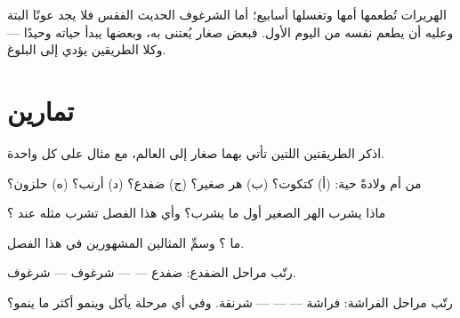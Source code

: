 \begin{remark}\label{rem:g2:animals-grow-up:care}
الهريرات تُطعمها أمها وتغسلها أسابيع؛ أما الشرغوف الحديث الفقس فلا
يجد عونًا البتة وعليه أن يطعم نفسه من اليوم الأول. فبعض صغار
 يُعتنى به، وبعضها يبدأ حياته وحيدًا --- وكلا الطريقين
يؤدي إلى البلوغ.
\end{remark}

\section{تمارين}

\begin{exercise}[$\star$]\label{exo:g2:animals-grow-up:1}
اذكر الطريقتين اللتين تأتي بهما صغار  إلى العالم، مع
مثال على كل واحدة.
\end{exercise}

\begin{exercise}[$\star$]\label{exo:g2:animals-grow-up:2}
من  أم ولادةً حية: (أ) كتكوت؟ (ب) هر صغير؟ (ج) ضفدع؟ (د)
أرنب؟ (ه) حلزون؟
\end{exercise}

\begin{exercise}[$\star$]\label{exo:g2:animals-grow-up:3}
ماذا يشرب الهر الصغير أول ما يشرب؟ وأي  هذا الفصل تشرب
مثله عند ؟
\end{exercise}

\begin{exercise}[$\star$]\label{exo:g2:animals-grow-up:4}
ما ؟ وسمِّ المثالين المشهورين في هذا الفصل.
\end{exercise}

\begin{exercise}[$\star$]\label{exo:g2:animals-grow-up:5}
رتّب مراحل الضفدع: ضفدع ---  --- شرغوف  --- شرغوف.
\end{exercise}

\begin{exercise}[$\star$]\label{exo:g2:animals-grow-up:6}
رتّب مراحل الفراشة: فراشة ---  ---  --- شرنقة. وفي أي
مرحلة يأكل   وينمو أكثر ما ينمو؟
\end{exercise}

